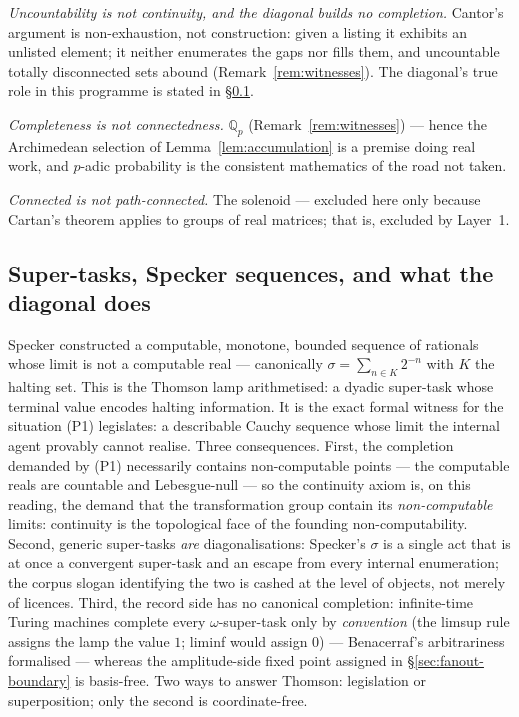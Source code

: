 \emph{Uncountability is not continuity, and the diagonal builds no completion.} Cantor's
argument is non-exhaustion, not construction: given a listing it exhibits an unlisted
element; it neither enumerates the gaps nor fills them, and uncountable totally
disconnected sets abound (Remark~\ref{rem:witnesses}). The diagonal's true role in this
programme is stated in \S\ref{app:cont-specker}.

\emph{Completeness is not connectedness.} $\mathbb{Q}_p$ (Remark~\ref{rem:witnesses})
--- hence the Archimedean selection of Lemma~\ref{lem:accumulation} is a premise doing
real work, and $p$-adic probability \cite{khrennikov-padic} is the consistent mathematics
of the road not taken.

\emph{Connected is not path-connected.} The solenoid --- excluded here only because
Cartan's theorem applies to groups of real matrices; that is, excluded by Layer~1.

\subsection{Super-tasks, Specker sequences, and what the diagonal does}
\label{app:cont-specker}

Specker \cite{specker1949} constructed a computable, monotone, bounded sequence of
rationals whose limit is not a computable real --- canonically
$\sigma = \sum_{n \in K} 2^{-n}$ with $K$ the halting set. This is the Thomson lamp
arithmetised: a dyadic super-task whose terminal value encodes halting information. It is
the exact formal witness for the situation (P1) legislates: a describable Cauchy sequence
whose limit the internal agent provably cannot realise. Three consequences. First, the
completion demanded by (P1) necessarily contains non-computable points --- the computable
reals are countable and Lebesgue-null --- so the continuity axiom is, on this reading,
the demand that the transformation group contain its \emph{non-computable} limits:
continuity is the topological face of the founding non-computability. Second, generic
super-tasks \emph{are} diagonalisations: Specker's $\sigma$ is a single act that is at
once a convergent super-task and an escape from every internal enumeration; the corpus
slogan identifying the two is cashed at the level of objects, not merely of licences.
Third, the record side has no canonical completion: infinite-time Turing machines
\cite{hamkinslewis2000} complete every $\omega$-super-task only by \emph{convention}
(the limsup rule assigns the lamp the value $1$; liminf would assign $0$) --- Benacerraf's
arbitrariness \cite{benacerraf1962} formalised --- whereas the amplitude-side fixed point
assigned in \S\ref{sec:fanout-boundary} is basis-free. Two ways to answer Thomson:
legislation or superposition; only the second is coordinate-free.

